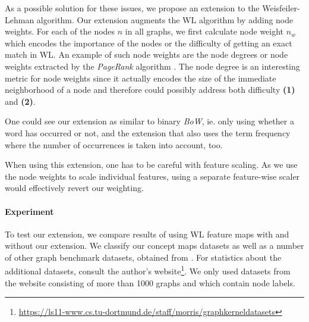 As a possible solution for these issues, we propose an extension to the Weisfeiler-Lehman algorithm.
Our extension augments the WL algorithm by adding node weights.
For each of the nodes $n$ in all graphs, we first calculate node weight $n_w$ which encodes the importance of the nodes or the difficulty of getting an exact match in WL.
An example of such node weights are the node degrees or node weights extracted by the \textit{PageRank} algorithm \cite{Page1998}.
The node degree is an interesting metric for node weights since it actually encodes the size of the immediate neighborhood of a node and therefore could possibly address both difficulty \textbf{(1)} and \textbf{(2)}.

One could see our extension as similar to binary \textit{BoW}, ie. only using whether a word has occurred or not, and the extension that also uses the term frequency where the number of occurrences is taken into account, too.

When using this extension, one has to be careful with feature scaling. As we use the node weights to scale individual features, using a separate feature-wise scaler would effectively revert our weighting.

\paragraph{Experiment}
To test our extension, we compare results of using WL feature maps with and without our extension.
We classify our concept maps datasets as well as a number of other graph benchmark datasets, obtained from \cite{Kersting2016}.
For statistics about the additional datasets, consult the author's website\footnote{\url{https://ls11-www.cs.tu-dortmund.de/staff/morris/graphkerneldatasets}}.
We only used datasets from the website consisting of more than 1000 graphs and which contain node labels.

